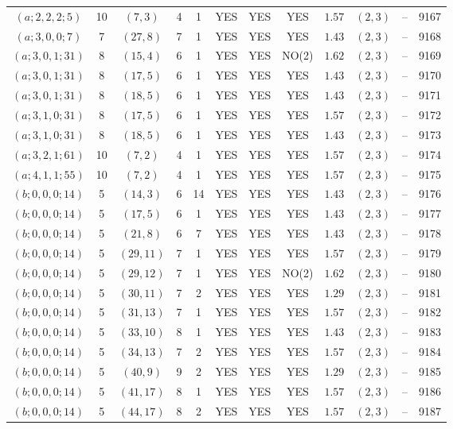 \begin{longtable}{|c|c|c|c|c|c|c|c|c|c|c|c|}
$(a;2,2,2;5)$ & 10 & $(7,3)$ & 4 & 1 & YES & YES & YES & $1.57$ & $(2,3)$ & -- & 9167\\
$(a;3,0,0;7)$ & 7 & $(27,8)$ & 7 & 1 & YES & YES & YES & $1.43$ & $(2,3)$ & -- & 9168\\
$(a;3,0,1;31)$ & 8 & $(15,4)$ & 6 & 1 & YES & YES & NO(2) & $1.62$ & $(2,3)$ & -- & 9169\\
$(a;3,0,1;31)$ & 8 & $(17,5)$ & 6 & 1 & YES & YES & YES & $1.43$ & $(2,3)$ & -- & 9170\\
$(a;3,0,1;31)$ & 8 & $(18,5)$ & 6 & 1 & YES & YES & YES & $1.43$ & $(2,3)$ & -- & 9171\\
$(a;3,1,0;31)$ & 8 & $(17,5)$ & 6 & 1 & YES & YES & YES & $1.57$ & $(2,3)$ & -- & 9172\\
$(a;3,1,0;31)$ & 8 & $(18,5)$ & 6 & 1 & YES & YES & YES & $1.43$ & $(2,3)$ & -- & 9173\\
$(a;3,2,1;61)$ & 10 & $(7,2)$ & 4 & 1 & YES & YES & YES & $1.57$ & $(2,3)$ & -- & 9174\\
$(a;4,1,1;55)$ & 10 & $(7,2)$ & 4 & 1 & YES & YES & YES & $1.57$ & $(2,3)$ & -- & 9175\\
$(b;0,0,0;14)$ & 5 & $(14,3)$ & 6 & 14 & YES & YES & YES & $1.43$ & $(2,3)$ & -- & 9176\\
$(b;0,0,0;14)$ & 5 & $(17,5)$ & 6 & 1 & YES & YES & YES & $1.43$ & $(2,3)$ & -- & 9177\\
$(b;0,0,0;14)$ & 5 & $(21,8)$ & 6 & 7 & YES & YES & YES & $1.43$ & $(2,3)$ & -- & 9178\\
$(b;0,0,0;14)$ & 5 & $(29,11)$ & 7 & 1 & YES & YES & YES & $1.57$ & $(2,3)$ & -- & 9179\\
$(b;0,0,0;14)$ & 5 & $(29,12)$ & 7 & 1 & YES & YES & NO(2) & $1.62$ & $(2,3)$ & -- & 9180\\
$(b;0,0,0;14)$ & 5 & $(30,11)$ & 7 & 2 & YES & YES & YES & $1.29$ & $(2,3)$ & -- & 9181\\
$(b;0,0,0;14)$ & 5 & $(31,13)$ & 7 & 1 & YES & YES & YES & $1.57$ & $(2,3)$ & -- & 9182\\
$(b;0,0,0;14)$ & 5 & $(33,10)$ & 8 & 1 & YES & YES & YES & $1.43$ & $(2,3)$ & -- & 9183\\
$(b;0,0,0;14)$ & 5 & $(34,13)$ & 7 & 2 & YES & YES & YES & $1.57$ & $(2,3)$ & -- & 9184\\
$(b;0,0,0;14)$ & 5 & $(40,9)$ & 9 & 2 & YES & YES & YES & $1.29$ & $(2,3)$ & -- & 9185\\
$(b;0,0,0;14)$ & 5 & $(41,17)$ & 8 & 1 & YES & YES & YES & $1.57$ & $(2,3)$ & -- & 9186\\
$(b;0,0,0;14)$ & 5 & $(44,17)$ & 8 & 2 & YES & YES & YES & $1.57$ & $(2,3)$ & -- & 9187\\

\end{longtable}
